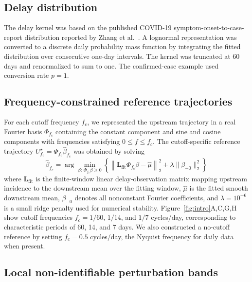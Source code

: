 \subsection{Delay distribution}

The delay kernel was based on the published COVID-19 symptom-onset-to-case-report distribution reported by Zhang et al.~\cite{zhang2020evolving}. A lognormal representation was converted to a discrete daily probability mass function by integrating the fitted distribution over consecutive one-day intervals. The kernel was truncated at 60 days and renormalized to sum to one. The confirmed-case example used conversion rate \(p=1\).

\subsection{Frequency-constrained reference trajectories}

For each cutoff frequency \(f_c\), we represented the upstream trajectory in a real Fourier basis \(\Phi_{f_c}\) containing the constant component and sine and cosine components with frequencies satisfying \(0\leq f\leq f_c\). The cutoff-specific reference trajectory \(U^\star_{f_c}=\Phi_{f_c}\widehat\beta_{f_c}\) was obtained by solving
\[
\widehat\beta_{f_c}
=
\arg\min_{\beta:\,\Phi_{f_c}\beta\geq 0}
\left\{
\left\|\mathbf L_{\mathrm{fit}}\Phi_{f_c}\beta-\widehat{\mu}\right\|_2^2
+\lambda\|\beta_{-0}\|_2^2
\right\}
\]
where \(\mathbf L_{\mathrm{fit}}\) is the finite-window linear delay-observation matrix mapping upstream incidence to the downstream mean over the fitting window, \(\widehat{\mu}\) is the fitted smooth downstream mean, \(\beta_{-0}\) denotes all nonconstant Fourier coefficients, and \(\lambda=10^{-6}\) is a small ridge penalty used for numerical stability. Figure~\ref{fig:intro}A,C,G,H show cutoff frequencies \(f_c=1/60\), \(1/14\), and \(1/7\) cycles/day, corresponding to characteristic periods of 60, 14, and 7 days. We also constructed a no-cutoff reference by setting \(f_c=0.5\) cycles/day, the Nyquist frequency for daily data when present.

\subsection{Local non-identifiable perturbation bands}

